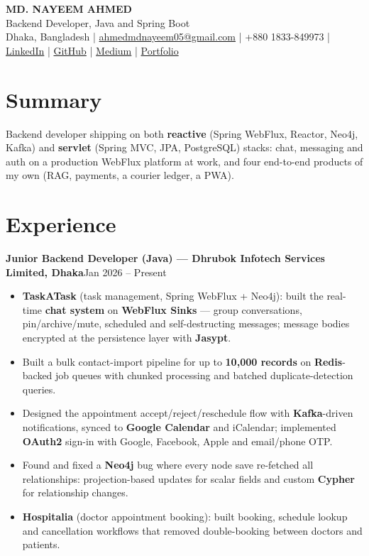 \documentclass[10pt, letterpaper]{article}
\newenvironment{highlights}{
    \begin{itemize}[topsep=1pt, parsep=1pt, partopsep=0pt, itemsep=0pt, leftmargin=12pt]
}{
    \end{itemize}
}
\newcommand{\entry}[2]{\textbf{#1}\hfill #2\par}
\begin{document}
\begin{center}
    {\fontsize{20pt}{20pt}\selectfont\textbf{MD. NAYEEM AHMED}}\\[4pt]
    Backend Developer, Java and Spring Boot\\[3pt]
    {\small Dhaka, Bangladesh \;|\; \href{mailto:ahmedmdnayeem05@gmail.com}{ahmedmdnayeem05@gmail.com} \;|\; +880 1833-849973 \;|\;
    \href{https://linkedin.com/in/md-nayeem-ahmed}{LinkedIn} \;|\;
    \href{https://github.com/nay-eem-01}{GitHub} \;|\;
    \href{https://medium.com/@ahmedmdnayeem05}{Medium} \;|\;
    \href{https://nayeem-ahmed-portfolio.netlify.app/}{Portfolio}}
\end{center}

\section{Summary}
Backend developer shipping on both \textbf{reactive} (Spring WebFlux, Reactor, Neo4j, Kafka) and \textbf{servlet} (Spring MVC, JPA, PostgreSQL) stacks: chat, messaging and auth on a production WebFlux platform at work, and four end-to-end products of my own (RAG, payments, a courier ledger, a PWA).

\section{Experience}

\entry{Junior Backend Developer (Java) --- Dhrubok Infotech Services Limited, Dhaka}{Jan 2026 -- Present}
\begin{highlights}
    \item \textbf{TaskATask} (task management, Spring WebFlux + Neo4j): built the real-time \textbf{chat system} on \textbf{WebFlux Sinks} --- group conversations, pin/archive/mute, scheduled and self-destructing messages; message bodies encrypted at the persistence layer with \textbf{Jasypt}.
    \item Built a bulk contact-import pipeline for up to \textbf{10,000 records} on \textbf{Redis}-backed job queues with chunked processing and batched duplicate-detection queries.
    \item Designed the appointment accept/reject/reschedule flow with \textbf{Kafka}-driven notifications, synced to \textbf{Google Calendar} and iCalendar; implemented \textbf{OAuth2} sign-in with Google, Facebook, Apple and email/phone OTP.
    \item Found and fixed a \textbf{Neo4j} bug where every node save re-fetched all relationships: projection-based updates for scalar fields and custom \textbf{Cypher} for relationship changes.
    \item \textbf{Hospitalia} (doctor appointment booking): built booking, schedule lookup and cancellation workflows that removed double-booking between doctors and patients.
\end{highlights}
\end{document}
